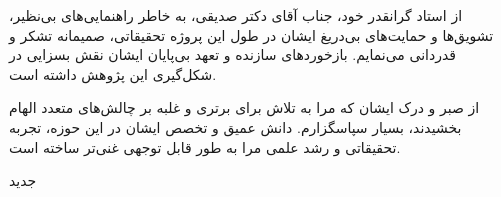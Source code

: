


\begin{center}
\end{center}

از استاد گرانقدر خود، جناب آقای دکتر صدیقی، به خاطر راهنمایی‌های بی‌نظیر، تشویق‌ها و حمایت‌های بی‌دریغ ایشان در طول این پروژه تحقیقاتی، صمیمانه تشکر و قدردانی می‌نمایم. بازخوردهای سازنده و تعهد بی‌پایان ایشان نقش بسزایی در شکل‌گیری این پژوهش داشته است.

از صبر و درک ایشان که مرا به تلاش برای برتری و غلبه بر چالش‌های متعدد الهام بخشیدند، بسیار سپاسگزارم. دانش عمیق و تخصص ایشان در این حوزه، تجربه تحقیقاتی و رشد علمی مرا به طور قابل توجهی غنی‌تر ساخته است.

‌جدید

